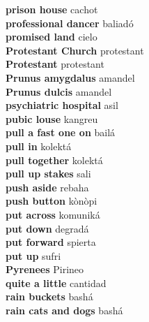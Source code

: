 \textbf{ prison house  } cachot \\
\textbf{ professional dancer  } baliadó \\
\textbf{ promised land  } cielo \\
\textbf{ Protestant Church  } protestant \\
\textbf{ Protestant  } protestant \\
\textbf{ Prunus amygdalus  } amandel \\
\textbf{ Prunus dulcis  } amandel \\
\textbf{ psychiatric hospital  } asil \\
\textbf{ pubic louse  } kangreu \\
\textbf{ pull a fast one on  } bailá \\
\textbf{ pull in  } kolektá \\
\textbf{ pull together  } kolektá \\
\textbf{ pull up stakes  } sali \\
\textbf{ push aside  } rebaha \\
\textbf{ push button  } kònòpi \\
\textbf{ put across  } komuniká \\
\textbf{ put down  } degradá \\
\textbf{ put forward  } spierta \\
\textbf{ put up  } sufri \\
\textbf{ Pyrenees  } Pirineo \\
\textbf{ quite a little  } cantidad \\
\textbf{ rain buckets  } bashá \\
\textbf{ rain cats and dogs  } bashá \\
